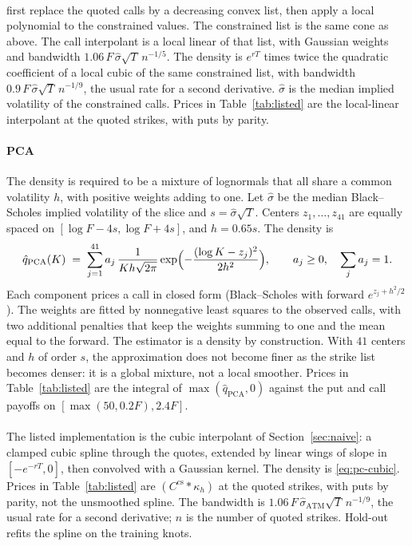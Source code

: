 \documentclass[preprint,12pt,authoryear,times]{elsarticle}
\begin{document}
\paragraph{\citeauthor{aitsahalia2003}}
\citet{aitsahalia2003} first replace the quoted calls by a decreasing convex list, then apply a local polynomial to the constrained values. The constrained list is the same cone as \citeauthor{yatchew2006} above. The call interpolant is a local linear of that list, with Gaussian weights and bandwidth \(1.06\,F\,\hat\sigma\sqrt{T}\,n^{-1/5}\). The density is \(e^{rT}\) times twice the quadratic coefficient of a local cubic of the same constrained list, with bandwidth \(0.9\,F\,\hat\sigma\sqrt{T}\,n^{-1/9}\), the usual rate for a second derivative. \(\hat\sigma\) is the median implied volatility of the constrained calls. Prices in Table~\ref{tab:listed} are the local-linear interpolant at the quoted strikes, with puts by parity.

\paragraph{\citeauthor{bondarenko2003} PCA}
The density is required to be a mixture of lognormals that all share a common volatility \(h\), with positive weights adding to one. Let \(\hat\sigma\) be the median Black--Scholes implied volatility of the slice and \(s=\hat\sigma\sqrt{T}\). Centers \(z_1,\ldots,z_{41}\) are equally spaced on \([\log F-4s,\log F+4s]\), and \(h=0.65s\). The density is
\begin{equation}
\label{eq:pca-q}
\hat q_{\mathrm{PCA}}(K)
\;=\;
\sum_{j=1}^{41} a_j\,\frac{1}{Kh\sqrt{2\pi}}
\exp\Bigl(-\frac{(\log K-z_j)^2}{2h^2}\Bigr),
\qquad
a_j\ge 0,\quad
\sum_{j}a_j=1.
\end{equation}
Each component prices a call in closed form (Black--Scholes with forward \(e^{z_j+h^2/2}\)). The weights are fitted by nonnegative least squares to the observed calls, with two additional penalties that keep the weights summing to one and the mean equal to the forward. The estimator is a density by construction. With \(41\) centers and \(h\) of order \(s\), the approximation does not become finer as the strike list becomes denser: it is a global mixture, not a local smoother. Prices in Table~\ref{tab:listed} are the integral of \(\max(\hat q_{\mathrm{PCA}},0)\) against the put and call payoffs on \([\max(50,0.2F),2.4F]\).

\paragraph{\citeauthor{priestley1972}}
The listed implementation is the cubic interpolant of Section~\ref{sec:naive}: a clamped cubic spline through the quotes, extended by linear wings of slope in \([-e^{-rT},0]\), then convolved with a Gaussian kernel. The density is \eqref{eq:pc-cubic}. Prices in Table~\ref{tab:listed} are \((C^{\mathrm{cs}}\ast\kappa_h)\) at the quoted strikes, with puts by parity, not the unsmoothed spline. The bandwidth is \(1.06\,F\,\hat\sigma_{\mathrm{ATM}}\sqrt{T}\,n^{-1/9}\), the usual rate for a second derivative; \(n\) is the number of quoted strikes. Hold-out refits the spline on the training knots.
\end{document}
